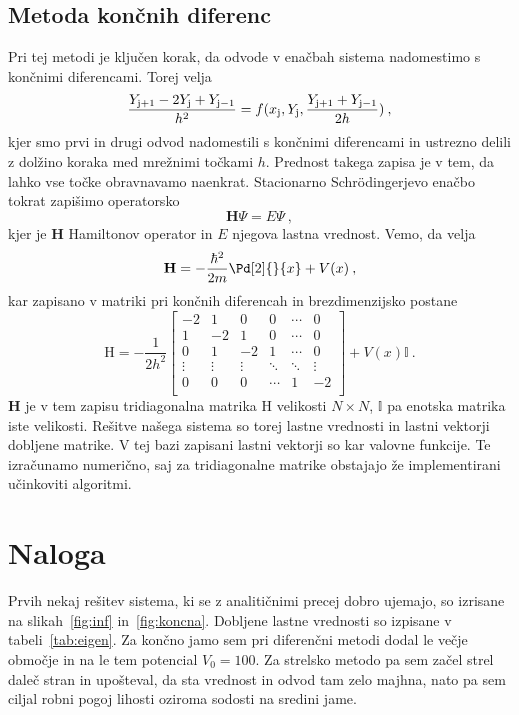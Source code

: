 \documentclass{porocilo}
\begin{document}
\subsection{Metoda končnih diferenc}
Pri tej metodi je ključen korak, da odvode v enačbah sistema nadomestimo s končnimi diferencami. Torej velja
\begin{equation*}
    \frac{Y_{\rm j+1} - 2 Y_{\rm j} + Y_{\rm j-1}}{h^2} = f(x_{\rm j}, Y_{\rm j}, \frac{Y_{\rm j+1} + Y_{\rm j-1}}{2h}) \>,
\end{equation*}
kjer smo prvi in drugi odvod nadomestili s končnimi diferencami in ustrezno delili z dolžino koraka med mrežnimi točkami $h$. Prednost takega zapisa je v tem, da lahko vse točke obravnavamo naenkrat. Stacionarno Schr{\"o}dingerjevo enačbo tokrat zapišimo operatorsko
\begin{equation*}
    \mathbf{H} \Psi = E\Psi\>,
\end{equation*}
kjer je $\mathbf{H}$ Hamiltonov operator in $E$ njegova lastna vrednost. Vemo, da velja
\begin{equation*}
    \mathbf{H} = -\frac{\hbar^2}{2m} \Pd[2]{}{x} + V(x)\>,
\end{equation*}
kar zapisano v matriki pri končnih diferencah in brezdimenzijsko postane
\begin{equation*}
    \text{H} = -\frac{1}{2 h^2} \begin{bmatrix}
        -2     & 1      & 0      & 0      & \cdots & 0      \\
        1      & -2     & 1      & 0      & \cdots & 0      \\
        0      & 1      & -2     & 1      & \cdots & 0      \\
        \vdots & \vdots & \vdots & \ddots & \ddots & \vdots \\
        0      & 0      & 0      & \cdots & 1      & -2     \\
    \end{bmatrix} + V(x) \mathbb{I}\>.
\end{equation*}
$\mathbf{H}$ je v tem zapisu tridiagonalna matrika H velikosti $N \times N$, $\mathbb{I}$ pa enotska matrika iste velikosti. Rešitve našega sistema so torej lastne vrednosti in lastni vektorji dobljene matrike. V tej bazi zapisani lastni vektorji so kar valovne funkcije. Te izračunamo numerično, saj za tridiagonalne matrike obstajajo že implementirani učinkoviti algoritmi.

\section{Naloga}
Prvih nekaj rešitev sistema, ki se z analitičnimi precej dobro ujemajo, so izrisane na slikah~\ref{fig:inf} in~\ref{fig:koncna}. Dobljene lastne vrednosti so izpisane v tabeli~\ref{tab:eigen}. Za končno jamo sem pri diferenčni metodi dodal le večje območje in na le tem potencial $V_0 = 100$. Za strelsko metodo pa sem začel strel daleč stran in upošteval, da sta vrednost in odvod tam zelo majhna, nato pa sem ciljal robni pogoj lihosti oziroma sodosti na sredini jame.
\end{document}
